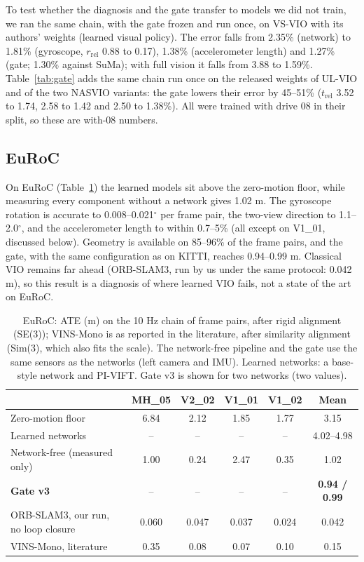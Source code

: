 \documentclass[pdflatex,sn-nature]{sn-jnl}
\newcommand{\tbf}[1]{\textbf{#1}}
\begin{document}
To test whether the diagnosis and the gate transfer to models we did not train, we ran the same chain, with the gate frozen and run once, on VS-VIO\cite{Yang2022} with its authors' weights (learned visual policy). The error falls from 2.35\% (network) to 1.81\% (gyroscope, $r_\mathrm{rel}$ 0.88 to 0.17), 1.38\% (accelerometer length) and 1.27\% (gate; 1.30\% against SuMa); with full vision it falls from 3.88 to 1.59\%. Table~\ref{tab:gate} adds the same chain run once on the released weights of UL-VIO\cite{Park2024ULVIO} and of the two NASVIO variants\cite{Chen2023NASVIO}: the gate lowers their error by 45--51\% ($t_\mathrm{rel}$ 3.52 to 1.74, 2.58 to 1.42 and 2.50 to 1.38\%). All were trained with drive 08 in their split, so these are with-08 numbers.

\subsection{EuRoC}

On EuRoC (Table~\ref{tab:euroc}) the learned models sit above the zero-motion floor, while measuring every component without a network gives 1.02 m. The gyroscope rotation is accurate to 0.008--0.021$^\circ$ per frame pair, the two-view direction to 1.1--2.0$^\circ$, and the accelerometer length to within 0.7--5\% (all except on V1\_01, discussed below). Geometry is available on 85--96\% of the frame pairs, and the gate, with the same configuration as on KITTI, reaches 0.94--0.99 m. Classical VIO remains far ahead (ORB-SLAM3\cite{Campos2021}, run by us under the same protocol: 0.042 m), so this result is a diagnosis of where learned VIO fails, not a state of the art on EuRoC.

\begin{table}[t]
\caption{EuRoC: ATE (m) on the 10 Hz chain of frame pairs, after rigid alignment (SE(3)); VINS-Mono is as reported in the literature, after similarity alignment (Sim(3), which also fits the scale). The network-free pipeline and the gate use the same sensors as the networks (left camera and IMU). Learned networks: a base-style network and PI-VIFT. Gate v3 is shown for two networks (two values).}\label{tab:euroc}
\small
\setlength{\tabcolsep}{3pt}
\begin{tabular}{@{}lccccc@{}}
\toprule
 & MH\_05 & V2\_02 & V1\_01 & V1\_02 & Mean \\
\midrule
Zero-motion floor & 6.84 & 2.12 & 1.85 & 1.77 & 3.15 \\
Learned networks & -- & -- & -- & -- & 4.02--4.98 \\
Network-free (measured only) & 1.00 & 0.24 & 2.47 & 0.35 & 1.02 \\
\tbf{Gate v3} & -- & -- & -- & -- & \tbf{0.94 / 0.99} \\
ORB-SLAM3, our run, no loop closure & 0.060 & 0.047 & 0.037 & 0.024 & 0.042 \\
VINS-Mono\cite{Delmerico2018}, literature & 0.35 & 0.08 & 0.07 & 0.10 & 0.15 \\
\bottomrule
\end{tabular}
\end{table}
\end{document}
